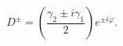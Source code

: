 \begin{equation}
D^{\pm }=\left( \frac{\gamma _{2}\pm i\gamma _{1}}{2}\right) e^{\pm i\varphi}.
\end{equation}

